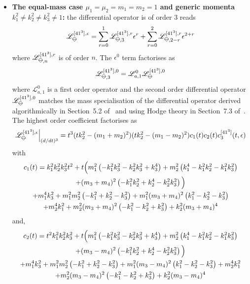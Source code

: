 \documentclass[a4paper,12pt]{article}
\numberwithin{equation}{section}
\numberwithin{figure}{section}
\newcommand{\IceCream}{	\begin{tikzpicture}[scale=0.05]
	\draw[color = black, fill=none] (2,0) arc(0:180:2);
		\draw [black] (-2,0) to (2,0);
		\draw [black] (-2,0) to (0,-2);
                	\draw [black] (2,0) to (0,-2);
	\end{tikzpicture}}
\begin{document}
\begin{itemize}
	
	\item \textbf{ The equal-mass case
		$\mu_1=\mu_2=m_1=m_2=1$ and generic momenta $k_1^2\neq
                k_2^2\neq
		k_3^2\neq 1$:} the differential operator is of order 3
	reads
	\begin{equation}
		\mathscr{L}_{\IceCream}^{[41^3],\epsilon}=\sum_{r=0}^1
		\mathscr{L}_{\IceCream,3}^{[41^3],r} \epsilon^r+ \sum_{r=0}^2   \mathscr{L}_{\IceCream,2-r}^{[41^3],r} \epsilon^{2+r}
	\end{equation}
	where $ \mathscr{L}_{\IceCream,n}^{[41^3],r}$  is of order $n$. The
	$\epsilon^0$ term factorises as
	\begin{equation}
		\mathscr{L}_{\IceCream,3}^{[41^3],0}=\mathscr{L}_{a,1}^0 \mathscr{L}_{\IceCream}^{[41^3],0}      
	\end{equation}
	where $\mathscr{L}_{a,1}^0$ is a first order operator   and the second order
	differential operator  $\mathscr{L}_{\IceCream}^{[41^3] ,0}
	$ matches the mass specialisation of the differential
	operator derived algorithmically in Section~5.2
	of~\cite{Lairez:2022zkj} and using Hodge theory in
	Section~7.3 of~\cite{Doran:2023yzu}.
	The highest order coefficient factorises as
	\begin{equation}
		\mathscr{L}_{\IceCream}^{[41^3],\epsilon}\Big|_{(d/dt)^3}=t^3(tk_2^2-(m_1+m_2)^2)(tk_2^2-(m_1-m_2)^2) c_1(t) c_2(t)c^{[41^3]}_3(t,\epsilon)   
	\end{equation}
	with
	\begin{multline}
		c_1(t)=   k_{1}^2 k_{2}^2 k_{3}^2 t^2 +t\Big(m_{1}^2 \left(-k_{1}^2 k_{3}^2-k_{2}^2 k_{3}^2+k_{3}^4\right)+m_{2}^2 \left(k_{1}^4-k_{1}^2
		k_{2}^2-k_{1}^2 k_{3}^2\right)\cr+(m_{3}+m_{4})^2
		\left(-k_{1}^2 k_{2}^2+k_{2}^4-k_{2}^2
		k_{3}^2\right)\Big)\cr
		+m_{1}^4 k_{3}^2+m_{1}^2 m_{2}^2 \left(-k_{1}^2+k_{2}^2-k_{3}^2\right)+m_{1}^2 (m_{3}+m_{4})^2
		\left(k_{1}^2-k_{2}^2-k_{3}^2\right)\cr+m_{2}^4 k_{1}^2+m_{2}^2 (m_{3}+m_{4})^2
		\left(-k_{1}^2-k_{2}^2+k_{3}^2\right)+k_{2}^2 (m_{3}+m_{4})^4
	\end{multline}
	and,
	\begin{multline}
		c_2(t)=t^2 k_{1}^2 k_{2}^2 k_{3}^2+t\Big(m_{1}^2 \left(-k_{1}^2 k_{3}^2-k_{2}^2 k_{3}^2+k_{3}^4\right)+m_{2}^2 \left(k_{1}^4-k_{1}^2
		k_{2}^2-k_{1}^2 k_{3}^2\right)\cr+(m_{3}-m_{4})^2 \left(-k_{1}^2 k_{2}^2+k_{2}^4-k_{2}^2 k_{3}^2\right)\Big)\cr
		+m_{1}^4 k_{3}^2+m_{1}^2 m_{2}^2 \left(-k_{1}^2+k_{2}^2-k_{3}^2\right)+m_{1}^2 (m_{3}-m_{4})^2
		\left(k_{1}^2-k_{2}^2-k_{3}^2\right)+m_{2}^4 k_{1}^2\cr+m_{2}^2 (m_{3}-m_{4})^2
		\left(-k_{1}^2-k_{2}^2+k_{3}^2\right)+k_{2}^2 (m_{3}-m_{4})^4

\end{multline}
\end{itemize}
\end{document}
